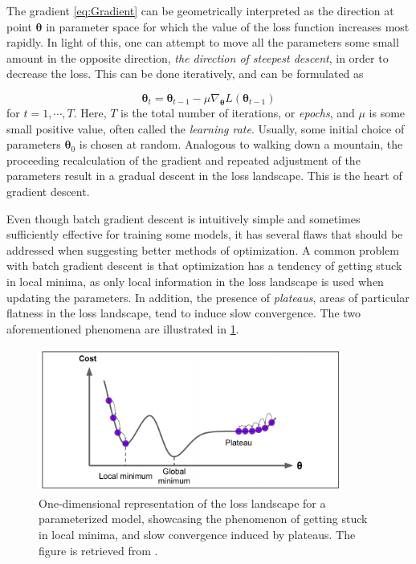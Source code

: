 The gradient \cref{eq:Gradient} can be geometrically interpreted as the direction at point $\boldsymbol{\theta}$ in parameter space for which the value of the loss function increases most rapidly. In light of this, one can attempt to move all the parameters some small amount in the opposite direction, \emph{the direction of steepest descent}, in order to decrease the loss. This can be done iteratively, and can be formulated as 


\begin{equation}\label{eq:ParameterUpdate}
    \boldsymbol{\theta}_{t} = \boldsymbol{\theta}_{t-1} - \mu \nabla_{\boldsymbol{\theta}} L(\boldsymbol{\theta}_{t-1})
\end{equation}
for $t=1, \cdots, T$. Here, $T$ is the total number of  iterations, or \emph{epochs}, and $\mu$ is some small positive value, often called the \emph{learning rate}. Usually, some initial choice of parameters $\boldsymbol{\theta}_{0}$ is chosen at random. Analogous to walking down a mountain, the proceeding recalculation of the gradient and repeated adjustment of the parameters result in a gradual descent in the loss landscape. This is the heart of gradient descent.

Even though batch gradient descent is intuitively simple and sometimes sufficiently effective for training some models, it has several flaws that should be addressed when suggesting better methods of optimization. A common problem with batch gradient descent is that optimization has a tendency of getting stuck in local minima, as only local information in the loss landscape is used when updating the parameters. In addition, the presence of \emph{plateaus}, areas of particular flatness in the loss landscape, tend to induce slow convergence. The two aforementioned phenomena are illustrated in \cref{fig:localMinima}.  


\begin{figure}[htp]
    \centering
    \includegraphics[width=10cm]{latex/figures/local_minimum_saddle_point.png}
    \caption{One-dimensional representation of the loss landscape for a parameterized model, showcasing the phenomenon of getting stuck in local minima, and slow convergence induced by plateaus. The figure is retrieved from \citet{hands-on}.}
    \label{fig:localMinima}
\end{figure}

